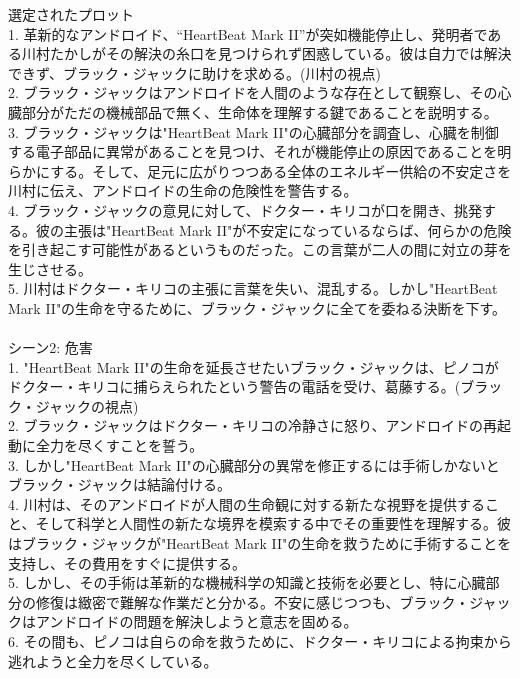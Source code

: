 \documentclass[a4j,12pt]{jsreport}
\begin{document}
\begin{breakitembox}
   [l]{選定されたプロット}
   \\
   1. 革新的なアンドロイド、“HeartBeat Mark II”が突如機能停止し、発明者である川村たかしがその解決の糸口を見つけられず困惑している。彼は自力では解決できず、ブラック・ジャックに助けを求める。(川村の視点)\\
   2. ブラック・ジャックはアンドロイドを人間のような存在として観察し、その心臓部分がただの機械部品で無く、生命体を理解する鍵であることを説明する。\\
   3. ブラック・ジャックは"HeartBeat Mark II"の心臓部分を調査し、心臓を制御する電子部品に異常があることを見つけ、それが機能停止の原因であることを明らかにする。そして、足元に広がりつつある全体のエネルギー供給の不安定さを川村に伝え、アンドロイドの生命の危険性を警告する。\\
   4. ブラック・ジャックの意見に対して、ドクター・キリコが口を開き、挑発する。彼の主張は"HeartBeat Mark II"が不安定になっているならば、何らかの危険を引き起こす可能性があるというものだった。この言葉が二人の間に対立の芽を生じさせる。\\
   5. 川村はドクター・キリコの主張に言葉を失い、混乱する。しかし"HeartBeat Mark II"の生命を守るために、ブラック・ジャックに全てを委ねる決断を下す。\\
   \\
   {シーン2: 危害}\\
   1. "HeartBeat Mark II"の生命を延長させたいブラック・ジャックは、ピノコがドクター・キリコに捕らえられたという警告の電話を受け、葛藤する。(ブラック・ジャックの視点)\\
   2. ブラック・ジャックはドクター・キリコの冷静さに怒り、アンドロイドの再起動に全力を尽くすことを誓う。\\
   3. しかし"HeartBeat Mark II"の心臓部分の異常を修正するには手術しかないとブラック・ジャックは結論付ける。\\
   4. 川村は、そのアンドロイドが人間の生命観に対する新たな視野を提供すること、そして科学と人間性の新たな境界を模索する中でその重要性を理解する。彼はブラック・ジャックが"HeartBeat Mark II"の生命を救うために手術することを支持し、その費用をすぐに提供する。\\
   5. しかし、その手術は革新的な機械科学の知識と技術を必要とし、特に心臓部分の修復は緻密で難解な作業だと分かる。不安に感じつつも、ブラック・ジャックはアンドロイドの問題を解決しようと意志を固める。\\
   6. その間も、ピノコは自らの命を救うために、ドクター・キリコによる拘束から逃れようと全力を尽くしている。\\

\end{breakitembox}
\end{document}
